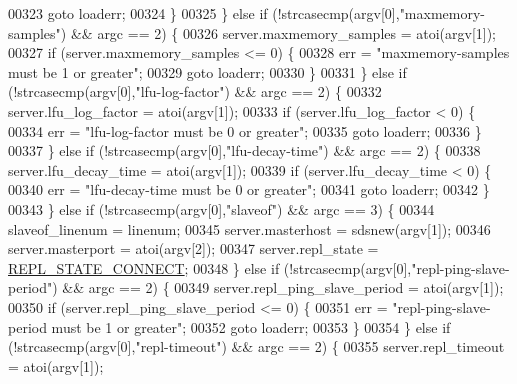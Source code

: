 \begin{DoxyCode}
{{00323                 \textcolor{keywordflow}{goto} loaderr;
00324             \}
00325         \} \textcolor{keywordflow}{else} \textcolor{keywordflow}{if} (!strcasecmp(argv[0],\textcolor{stringliteral}{"maxmemory-samples"}) && argc == 2) \{
00326             server.maxmemory\_samples = atoi(argv[1]);
00327             \textcolor{keywordflow}{if} (server.maxmemory\_samples <= 0) \{
00328                 err = \textcolor{stringliteral}{"maxmemory-samples must be 1 or greater"};
00329                 \textcolor{keywordflow}{goto} loaderr;
00330             \}
00331         \} \textcolor{keywordflow}{else} \textcolor{keywordflow}{if} (!strcasecmp(argv[0],\textcolor{stringliteral}{"lfu-log-factor"}) && argc == 2) \{
00332             server.lfu\_log\_factor = atoi(argv[1]);
00333             \textcolor{keywordflow}{if} (server.lfu\_log\_factor < 0) \{
00334                 err = \textcolor{stringliteral}{"lfu-log-factor must be 0 or greater"};
00335                 \textcolor{keywordflow}{goto} loaderr;
00336             \}
00337         \} \textcolor{keywordflow}{else} \textcolor{keywordflow}{if} (!strcasecmp(argv[0],\textcolor{stringliteral}{"lfu-decay-time"}) && argc == 2) \{
00338             server.lfu\_decay\_time = atoi(argv[1]);
00339             \textcolor{keywordflow}{if} (server.lfu\_decay\_time < 0) \{
00340                 err = \textcolor{stringliteral}{"lfu-decay-time must be 0 or greater"};
00341                 \textcolor{keywordflow}{goto} loaderr;
00342             \}
00343         \} \textcolor{keywordflow}{else} \textcolor{keywordflow}{if} (!strcasecmp(argv[0],\textcolor{stringliteral}{"slaveof"}) && argc == 3) \{
00344             slaveof\_linenum = linenum;
00345             server.masterhost = sdsnew(argv[1]);
00346             server.masterport = atoi(argv[2]);
00347             server.repl\_state = \hyperlink{server_8h_adfe013d4a620f0b98b47b2144760e69f}{REPL\_STATE\_CONNECT};
00348         \} \textcolor{keywordflow}{else} \textcolor{keywordflow}{if} (!strcasecmp(argv[0],\textcolor{stringliteral}{"repl-ping-slave-period"}) && argc == 2) \{
00349             server.repl\_ping\_slave\_period = atoi(argv[1]);
00350             \textcolor{keywordflow}{if} (server.repl\_ping\_slave\_period <= 0) \{
00351                 err = \textcolor{stringliteral}{"repl-ping-slave-period must be 1 or greater"};
00352                 \textcolor{keywordflow}{goto} loaderr;
00353             \}
00354         \} \textcolor{keywordflow}{else} \textcolor{keywordflow}{if} (!strcasecmp(argv[0],\textcolor{stringliteral}{"repl-timeout"}) && argc == 2) \{
00355             server.repl\_timeout = atoi(argv[1]);
}}
\end{DoxyCode}

